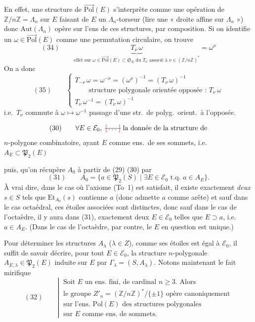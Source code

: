 \documentclass[11pt,a4paper]{article}
\begin{document}
En effet, une structure de $\overrightarrow{\mathrm{Pol}}(E)$ s'interprète
comme une opération de $\mathbb{Z}/n\mathbb{Z}=\Lambda_n$ sur $E$
faisant de $E$ un $\Lambda_n$-torseur
(lire une « droite affine sur $\Lambda_n$ »)
donc $\mathrm{Aut}(\Lambda_n)$ opère sur l'ens de ces
structures, par composition. Si on identifie
un $\omega\in\overrightarrow{\mathrm{Pol}}(E)$ comme une permutation
circulaire, on trouve
\[
(34)\qquad \underbrace{T_\nu\,\omega}_{\text{effet sur } \omega\in\overrightarrow{\mathrm{Pol}}(E)\subset\mathfrak{S}_E \text{ du } T_\nu \text{ associé à } \nu\in(\mathbb{Z}/n\mathbb{Z})^{*}}=\omega^{\nu}
\]
On a donc
\[
(35)\qquad \left\{\begin{array}{l}
T_{-\nu}\,\omega=\omega^{-\nu}=(\omega^{\nu})^{-1}=(T_\nu\,\omega)^{-1}\\
\qquad \text{structure polygonale orientée opposée : } T_\nu\,\omega\\
T_\nu\,\omega^{-1}=(T_\nu\,\omega)^{-1}
\end{array}\right.
\]
i.e.\ $T_\nu$ commute à \struck{\ill{}} $\omega\mapsto\omega^{-1}$
passage d'une str.\ de polyg.\ orient.\ à l'opposée.

\[
(30)\qquad \forall E\in\mathcal{E}_0,\ \text{\struck{\ill{}}}\ \text{la donnée de la structure de}
\]
\quad $n$-polygone combinatoire, ayant $E$ comme
ens.\ de ses sommets, i.e.\ $A_E\subset\mathfrak{P}_2(E)$

puis, qu'on récupère $A_0$ à partir de (29) (30)
par
\[
(31)\qquad A_0=\{a\in\mathfrak{P}_2(S)\mid \exists E\in\mathcal{E}_0 \text{ t.q.\ } a\in A_E\}.
\]
À vrai dire,  dans le cas où l'axiome (To~1) est
satisfait, il existe exactement \emph{deux} $s\in S$
tels que $\mathrm{Et}_{A_0}(s)$ contienne $a$ (donc admette
$a$ comme arête) et sauf dans le cas octaédral,
ces étoiles associées sont distinctes, donc sauf dans
le cas de l'octaèdre, il y aura dans (31),
exactement deux $E\in\mathcal{E}_0$ telles que $E\supset a$, i.e.\
$a\in A_E$. (Dans le cas de l'octaèdre, par contre,
le $E$ en question est unique.)

Pour déterminer les structures $A_\lambda$ ($\lambda\in Z$),
comme  ses étoiles est égal à $\mathcal{E}_0$, il suffit
de savoir décrire, \struck{\ill{}} pour tout $E\in\mathcal{E}_0$, la
structure $n$-polygonale $A_{E,\lambda}\in\mathfrak{P}_2(E)$ induite sur
\struck{\ill{}} $E$ par $\Gamma_\lambda=(S,A_\lambda)$. Notons maintenant
le fait mirifique
\[
(32)\qquad \left|\ \begin{array}{l}
\text{Soit } E \text{ un ens.\ fini, de cardinal } n\geqslant 3. \text{ Alors}\\
\text{le groupe } Z'_n=(\mathbb{Z}/n\mathbb{Z})^{*}/\{\pm 1\} \text{ opère canoniquement}\\
\text{sur l'ens.\ } \mathrm{Pol}(E) \text{ des structures polygonales}\\
\text{sur } E \text{ comme ens.\ de sommets.}
\end{array}\right.
\]
\end{document}
